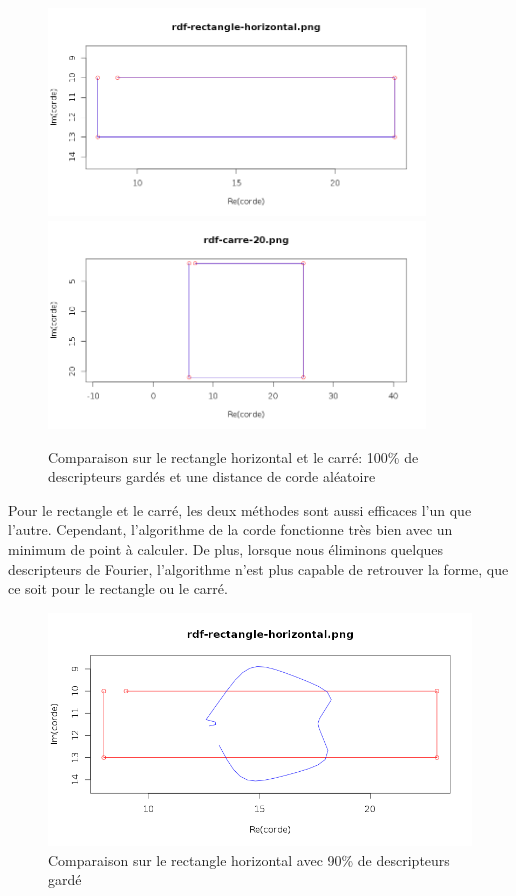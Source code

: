\documentclass[11pt]{article}
\begin{document}
  
    \begin{figure}[!h]
      \begin{center}
	\includegraphics[width=10cm]{../resultat/comp_rect.png}\\
	\includegraphics[width=10cm]{../resultat/comp_carre.png}
      \end{center}
      \caption{Comparaison sur le rectangle horizontal et le carré: 100\% de descripteurs gardés et une distance de corde aléatoire}
    \end{figure}
  
  \newpage
  
  Pour le rectangle et le carré, les deux méthodes sont aussi efficaces l'un que l'autre. Cependant, l'algorithme de la corde
  fonctionne très bien avec un minimum de point à calculer.
  De plus, lorsque nous éliminons quelques descripteurs de Fourier, l'algorithme n'est plus capable de
  retrouver la forme, que ce soit pour le rectangle ou le carré.\\
  
  \begin{center}
    \begin{figure}[!h]
      \includegraphics[width=15cm]{../resultat/comp_rate_rect.png}
      \caption{Comparaison sur le rectangle horizontal avec 90\% de descripteurs gardé}
    \end{figure}
  \end{center}
  
\end{document}
